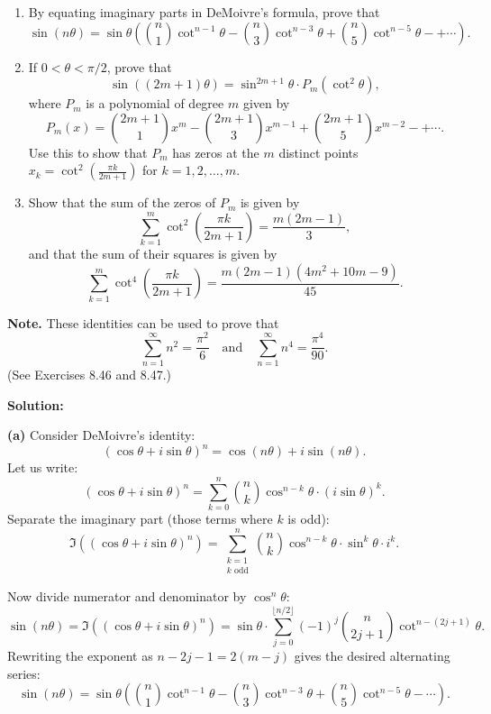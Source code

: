 \begin{problembox}
\begin{enumerate}[label=\textbf{(\alph*)}]
\item By equating imaginary parts in DeMoivre’s formula, prove that
\[
\sin(n\theta) = \sin \theta \left( \binom{n}{1} \cot^{n-1} \theta - \binom{n}{3} \cot^{n-3} \theta + \binom{n}{5} \cot^{n-5} \theta - + \cdots \right).
\]

\item If \( 0 < \theta < \pi/2 \), prove that
\[
\sin((2m+1)\theta) = \sin^{2m+1} \theta \cdot P_m(\cot^2 \theta),
\]
where \( P_m \) is a polynomial of degree \( m \) given by
\[
P_m(x) = \binom{2m+1}{1} x^m - \binom{2m+1}{3} x^{m-1} + \binom{2m+1}{5} x^{m-2} - +\cdots.
\]
Use this to show that \( P_m \) has zeros at the \( m \) distinct points \( x_k = \cot^2 \left( \frac{\pi k}{2m+1} \right) \) for \( k = 1, 2, \dots, m \).

\item Show that the sum of the zeros of \( P_m \) is given by
\[
\sum_{k=1}^m \cot^2 \left( \frac{\pi k}{2m+1} \right) = \frac{m(2m-1)}{3},
\]
and that the sum of their squares is given by
\[
\sum_{k=1}^m \cot^4 \left( \frac{\pi k}{2m+1} \right) = \frac{m(2m-1)(4m^2 + 10m - 9)}{45}.
\]
\end{enumerate}
\textbf{Note.} These identities can be used to prove that
\[
\sum_{n=1}^\infty n^2 = \frac{\pi^2}{6} \quad \text{and} \quad \sum_{n=1}^\infty n^4 = \frac{\pi^4}{90}.
\]
(See Exercises 8.46 and 8.47.)
\end{problembox}

\textbf{Solution:}

\textbf{(a)} Consider DeMoivre’s identity:
\[
(\cos \theta + i \sin \theta)^n = \cos(n\theta) + i \sin(n\theta).
\]
Let us write:
\[
(\cos \theta + i \sin \theta)^n = \sum_{k=0}^n \binom{n}{k} \cos^{n-k} \theta \cdot (i \sin \theta)^k.
\]
Separate the imaginary part (those terms where \( k \) is odd):
\[
\Im\left((\cos \theta + i \sin \theta)^n\right) = \sum_{\substack{k=1 \\ k \text{ odd}}}^n \binom{n}{k} \cos^{n-k} \theta \cdot \sin^k \theta \cdot i^k.
\]

Now divide numerator and denominator by \( \cos^n \theta \):
\[
\sin(n\theta) = \Im\left((\cos \theta + i \sin \theta)^n\right) 
= \sin \theta \cdot \sum_{j=0}^{\lfloor n/2 \rfloor} (-1)^j \binom{n}{2j+1} \cot^{n - (2j + 1)} \theta.
\]
Rewriting the exponent as \( n - 2j - 1 = 2(m-j) \) gives the desired alternating series:
\[
\sin(n\theta) = \sin \theta \left( \binom{n}{1} \cot^{n-1} \theta - \binom{n}{3} \cot^{n-3} \theta + \binom{n}{5} \cot^{n-5} \theta - \cdots \right).
\]

